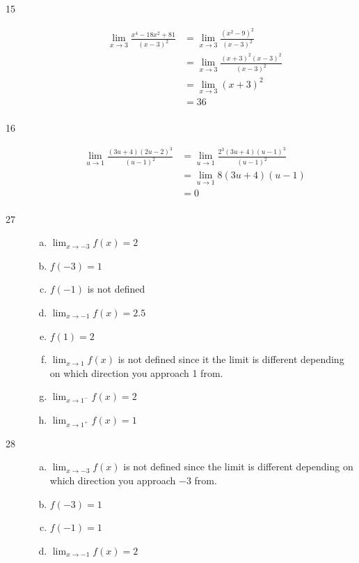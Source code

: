 \documentclass{exam}
\begin{document}
\begin{description}
    \item[15]
    \begin{align*}
       \lim_{x \to 3} \frac{x^4 - 18x^2 + 81}{(x-3)^2} &= \lim_{x \to 3} \frac{(x^2 - 9)^2}{(x-3)^2} \\
       &= \lim_{x \to 3} \frac{(x + 3)^2(x-3)^2}{(x-3)^2} \\
       &= \lim_{x \to 3} (x + 3)^2 \\
       &= 36 \\
    \end{align*}

    \item[16]
    \begin{align*}
       \lim_{u \to 1} \frac{(3u + 4)(2u-2)^3}{(u-1)^2} &=  \lim_{u \to 1} \frac{2^3(3u + 4)(u-1)^3}{(u-1)^2} \\
       &= \lim_{u \to 1} 8 (3u + 4)(u-1) \\  
       &= 0 \\
    \end{align*}

    \item[27]
    \begin{enumerate}[(a)]

    \item $\lim_{x \to -3} f(x) = 2$
    \item $f(-3) = 1$
    \item $f(-1)$ is not defined
    \item $\lim_{x \to -1} f(x) = 2.5$

    \item $f(1) = 2$
    \item $\lim_{x \to 1} f(x)$ is not defined since it the limit is different depending on which direction you approach 1 from.

    \item $\lim_{x \to 1^-} f(x) = 2$ 
    \item $\lim_{x \to 1^+} f(x) = 1$ 

    \end{enumerate}

    \item[28]
    \begin{enumerate}[(a)]

    \item $\lim_{x \to -3} f(x)$ is not defined since the limit is different depending on which direction you approach $-3$ from.
    \item $f(-3) = 1$

    \item $f(-1) = 1$
    \item $\lim_{x \to -1} f(x) = 2$


\end{enumerate}
\end{description}
\end{document}
